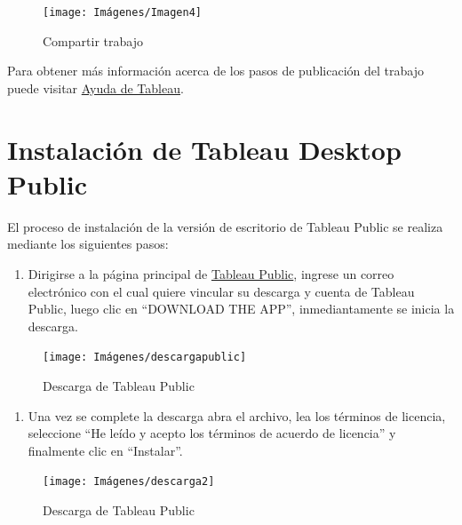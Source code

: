 \documentclass[
]{book}
\providecommand{\tightlist}{%
  \setlength{\itemsep}{0pt}\setlength{\parskip}{0pt}}
\begin{document}
\begin{figure}

{\centering \texttt{[image: Imágenes/Imagen4]} 

}

\caption{Compartir trabajo}\label{fig:compartir-fig}
\end{figure}

Para obtener más información acerca de los pasos de publicación del trabajo puede visitar \href{https://help.tableau.com/current/pro/desktop/en-us/save_savework.htm}{Ayuda de Tableau}.

\hypertarget{instalaciuxf3n-de-tableau-desktop-public}{%
\section{Instalación de Tableau Desktop Public}\label{instalaciuxf3n-de-tableau-desktop-public}}

El proceso de instalación de la versión de escritorio de Tableau Public se realiza mediante los siguientes pasos:

\begin{enumerate}
\def\labelenumi{\arabic{enumi}.}
\tightlist
\item
  Dirigirse a la página principal de \href{https://public.tableau.com/en-us/s/}{Tableau Public}, ingrese un correo electrónico con el cual quiere vincular su descarga y cuenta de Tableau Public, luego clic en ``DOWNLOAD THE APP'', inmediantamente se inicia la descarga.
\end{enumerate}

\begin{figure}

{\centering \texttt{[image: Imágenes/descargapublic]} 

}

\caption{Descarga de Tableau Public}\label{fig:descargapublic-fig}
\end{figure}

\begin{enumerate}
\def\labelenumi{\arabic{enumi}.}
\setcounter{enumi}{1}
\tightlist
\item
  Una vez se complete la descarga abra el archivo, lea los términos de licencia, seleccione ``He leído y acepto los términos de acuerdo de licencia'' y finalmente clic en ``Instalar''.
\end{enumerate}

\begin{figure}

{\centering \texttt{[image: Imágenes/descarga2]} 

}

\caption{Descarga de Tableau Public}\label{fig:descarga2-fig}
\end{figure}
\end{document}
